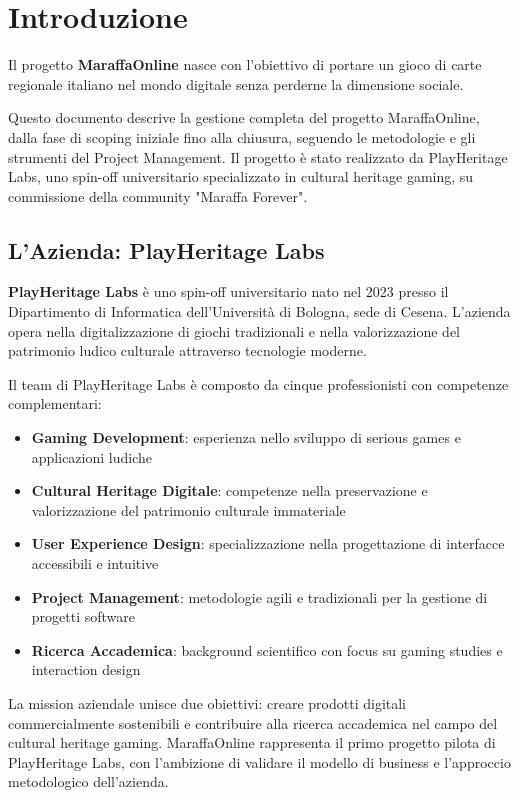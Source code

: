 \chapter{Introduzione}

Il progetto \textbf{MaraffaOnline} nasce con l'obiettivo di portare un gioco di carte regionale italiano nel mondo digitale senza perderne la dimensione sociale.

Questo documento descrive la gestione completa del progetto MaraffaOnline, dalla fase di scoping iniziale fino alla chiusura, seguendo le metodologie e gli strumenti del Project Management. Il progetto è stato realizzato da PlayHeritage Labs, uno spin-off universitario specializzato in cultural heritage gaming, su commissione della community "Maraffa Forever".

\section{L'Azienda: PlayHeritage Labs}

\textbf{PlayHeritage Labs} è uno spin-off universitario nato nel 2023 presso il Dipartimento di Informatica dell'Università di Bologna, sede di Cesena. L'azienda opera nella digitalizzazione di giochi tradizionali e nella valorizzazione del patrimonio ludico culturale attraverso tecnologie moderne.

Il team di PlayHeritage Labs è composto da cinque professionisti con competenze complementari:
\begin{itemize}
    \item \textbf{Gaming Development}: esperienza nello sviluppo di serious games e applicazioni ludiche
    \item \textbf{Cultural Heritage Digitale}: competenze nella preservazione e valorizzazione del patrimonio culturale immateriale
    \item \textbf{User Experience Design}: specializzazione nella progettazione di interfacce accessibili e intuitive
    \item \textbf{Project Management}: metodologie agili e tradizionali per la gestione di progetti software
    \item \textbf{Ricerca Accademica}: background scientifico con focus su gaming studies e interaction design
\end{itemize}

La mission aziendale unisce due obiettivi: creare prodotti digitali commercialmente sostenibili e contribuire alla ricerca accademica nel campo del cultural heritage gaming. MaraffaOnline rappresenta il primo progetto pilota di PlayHeritage Labs, con l'ambizione di validare il modello di business e l'approccio metodologico dell'azienda.

